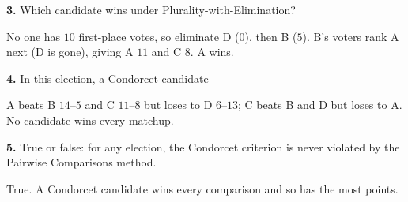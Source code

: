 \documentclass[12pt]{ximera}
\begin{document}
\begin{problem}
\begin{prompt}
\textbf{3.} Which candidate wins under Plurality-with-Elimination?

\begin{multipleChoice}
\end{multipleChoice}

\begin{feedback}
No one has $10$ first-place votes, so eliminate D ($0$), then B ($5$). B's voters rank
A next (D is gone), giving A $11$ and C $8$. A wins.
\end{feedback}
\end{prompt}

\begin{prompt}
\textbf{4.} In this election, a Condorcet candidate

\begin{multipleChoice}
\end{multipleChoice}

\begin{feedback}
A beats B $14$--$5$ and C $11$--$8$ but loses to D $6$--$13$; C beats B and D but loses
to A. No candidate wins every matchup.
\end{feedback}
\end{prompt}
\end{problem}

\begin{problem}
\textbf{5.} True or false: for any election, the Condorcet criterion is never violated by
the Pairwise Comparisons method.

\begin{multipleChoice}
\end{multipleChoice}

\begin{feedback}
True. A Condorcet candidate wins every comparison and so has the most points.
\end{feedback}
\end{problem}
\end{document}
